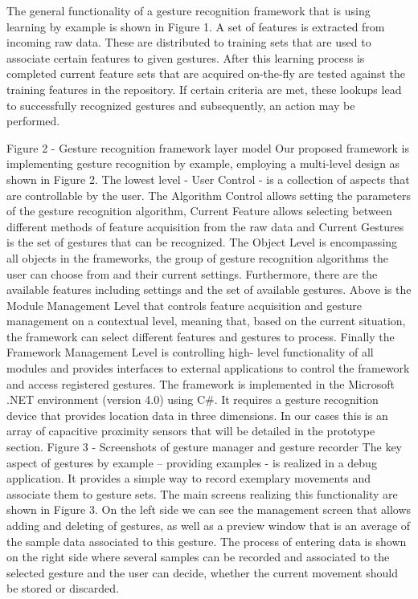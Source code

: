 The general functionality of a gesture recognition framework that is using learning by example is shown in Figure 1. A set of features is extracted from incoming raw data. These are distributed to training sets that are used to associate certain features to given gestures. After this learning process is completed current feature sets that are acquired on-the-fly are tested against the training features in the repository. If certain criteria are met, these lookups lead to successfully recognized gestures and
subsequently, an action may be performed. 

Figure 2 - Gesture recognition framework layer model
Our proposed framework is implementing gesture recognition by example, employing a multi-level design as shown in Figure 2. The lowest level - User Control - is a collection of aspects that are controllable by the user. The Algorithm Control allows setting the parameters of the gesture recognition algorithm, Current Feature allows selecting between different methods of feature acquisition from the raw data and Current Gestures is the set of gestures that
can be recognized. The Object Level is encompassing all objects in the frameworks, the group of gesture recognition algorithms the user can choose from and their current settings. Furthermore, there are the available features including settings and the set of available gestures. Above is the Module Management Level that controls feature acquisition and gesture management on a contextual level, meaning that, based on the current situation, the framework can select different features and gestures to process. Finally the Framework Management Level is controlling high-
level functionality of all modules and provides interfaces to external applications to control the framework and access registered gestures.
The framework is implemented in the Microsoft .NET environment (version 4.0) using C\#. It requires a gesture
recognition device that provides location data in three dimensions.
In our cases this is an array of capacitive proximity sensors that will be detailed in the prototype section.
Figure 3 - Screenshots of gesture manager and gesture
recorder
The key aspect of gestures by example – providing examples - is realized in a debug application. It provides a simple way to record exemplary movements and associate them to gesture sets. The main screens realizing this functionality are shown in Figure 3.
On the left side we can see the management screen that allows
adding and deleting of gestures, as well as a preview window that is an average of the sample data associated to this gesture. The process of entering data is shown on the right side where several samples can be recorded and associated to the selected gesture and the user can decide, whether the current movement should be stored or discarded.
